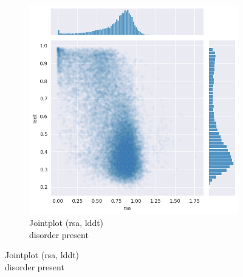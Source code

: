 \begin{figure}[h!]
\begin{subfigure}{0.5\linewidth}
        \includegraphics[width=\linewidth]{res/analysis/plots/dis1-jointplot_rsa-lddt.png}
        \caption{Jointplot (rsa, lddt)\\disorder present}
    \end{subfigure}
\end{figure}

\pagebreak

